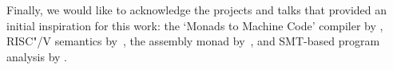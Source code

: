 
Finally, we would like to acknowledge the projects and talks
that provided an initial inspiration for this work: the `Monads to Machine
Code' compiler by \citet{diehl-monads-to-machines}, RISC"/V semantics
by~\citet{riscv-semantics}, the assembly monad by~\citet{asm-monad}, and
SMT-based program analysis by \citet{haskell-z3}.

